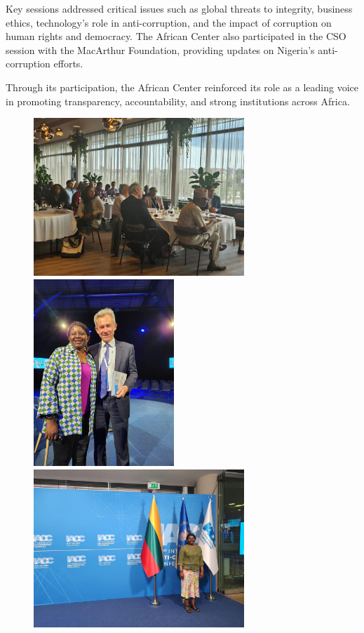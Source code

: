 \documentclass[
  letterpaper,
  DIV=11,
  numbers=noendperiod]{scrreprt}
\begin{document}
Key sessions addressed critical issues such as global threats to
integrity, business ethics, technology's role in anti-corruption, and
the impact of corruption on human rights and democracy. The African
Center also participated in the CSO session with the MacArthur
Foundation, providing updates on Nigeria's anti-corruption efforts.

Through its participation, the African Center reinforced its role as a
leading voice in promoting transparency, accountability, and strong
institutions across Africa.

\begin{figure}

\begin{minipage}{0.38\linewidth}
\includegraphics[width=3.125in,height=\textheight,keepaspectratio]{images/strengthen/08_0_acc.jpg}\end{minipage}%
%
\begin{minipage}{0.25\linewidth}
\includegraphics[width=2.08333in,height=\textheight,keepaspectratio]{images/strengthen/08_2_acc.jpg}\end{minipage}%
%
\begin{minipage}{0.38\linewidth}
\includegraphics[width=3.125in,height=\textheight,keepaspectratio]{images/strengthen/08_1_acc.jpg}\end{minipage}%

\end{figure}%
\end{document}

